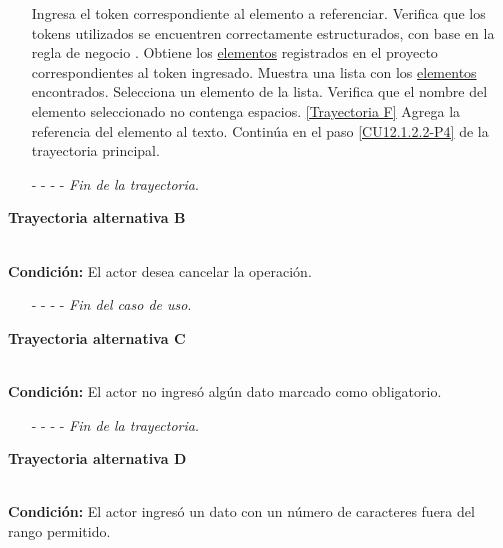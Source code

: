 \begin{enumerate}
	\UCpaso[\UCactor] Ingresa el token correspondiente al elemento a referenciar.
	\UCpaso[\UCsist] Verifica que los tokens utilizados se encuentren correctamente estructurados, con base en la regla de negocio . 
	\UCpaso[\UCsist] Obtiene los \hyperlink{tElemento}{elementos} registrados en el proyecto correspondientes al token ingresado. 
	\UCpaso[\UCsist] Muestra una lista con los \hyperlink{tElemento}{elementos} encontrados.
	\UCpaso[\UCactor] Selecciona un elemento de la lista.
	\UCpaso[\UCsist] Verifica que el nombre del elemento seleccionado no contenga espacios. \hyperlink{CU12-1-2-2:TAF}{[Trayectoria F]}
	\UCpaso[\UCsist] Agrega la referencia del elemento al texto. \label{CU12.1.2.2-TA1}
	\UCpaso Continúa en el paso \ref{CU12.1.2.2-P4} de la trayectoria principal.
	\item[- -] - - {\em {Fin de la trayectoria}}.%
\end{enumerate}
\hypertarget{CU12-1-2-2:TAB}{\textbf{Trayectoria alternativa B}}\\
\noindent \textbf{Condición:} El actor desea cancelar la operación.
\begin{enumerate}
	\UCpaso[\UCactor] Solicita cancelar la operación oprimiendo el botón  de la pantalla .
	\UCpaso[\UCsist] Muestra la pantalla .
	\item[- -] - - {\em {Fin del caso de uso}}.%
\end{enumerate}
\hypertarget{CU12-1-2-2:TAC}{\textbf{Trayectoria alternativa C}}\\
\noindent \textbf{Condición:} El actor no ingresó algún dato marcado como obligatorio.
\begin{enumerate}
	\UCpaso[\UCsist] Muestra el mensaje  señalando el campo que presenta el error en la pantalla .
	\UCpaso Regresa al paso \ref{CU12.1.2.2-P3} de la trayectoria principal.
	\item[- -] - - {\em {Fin de la trayectoria}}.%
\end{enumerate}
\hypertarget{CU12-1-2-2:TAD}{\textbf{Trayectoria alternativa D}}\\
\noindent \textbf{Condición:} El actor ingresó un dato con un número de caracteres fuera del rango permitido.
